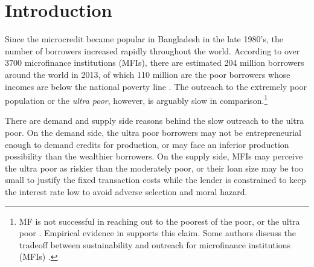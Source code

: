 

\section{Introduction}


	Since the microcredit became popular in Bangladesh in the late 1980's, the number of borrowers increased rapidly throughout the world. According to over 3700 microfinance institutions (MFIs), there are estimated 204 million borrowers around the world in 2013, of which 110 million are the poor borrowers whose incomes are below the national poverty line \citep{MFGateway2015}. The outreach to the extremely poor population or the \textit{ultra poor}, however, is arguably slow in comparison.\footnote{MF is not successful in reaching out to the poorest of the poor, or the ultra poor \citep[][]{Scully2004}. Empirical evidence in \citet{Yaron1994, Navajas2000, RahmanRazzaque2000, AghionMorduch2007} supports this claim. Some authors discuss the tradeoff between sustainability and outreach for microfinance institutions (MFIs) \citet{HermesLensink2011, HermesLensinkMeesters2011, Cull2011}. } 

	There are demand and supply side reasons behind the slow outreach to the ultra poor. On the demand side, the ultra poor borrowers may not be entrepreneurial enough to demand credits for production, or may face an inferior production possibility than the wealthier borrowers. On the supply side, MFIs may perceive the ultra poor as riskier than the moderately poor, or their loan size may be too small to justify the fixed transaction costs while the lender is constrained to keep the interest rate low to avoid adverse selection and moral hazard. 


